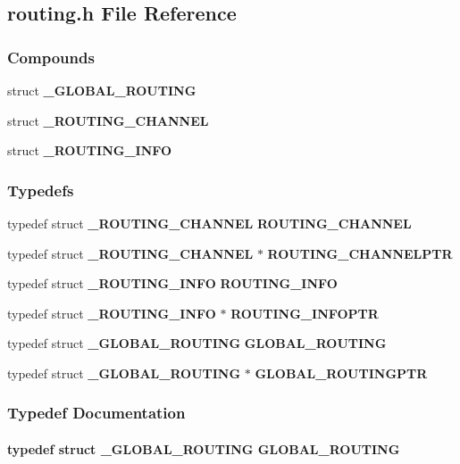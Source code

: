 \subsection{routing.h File Reference}
\label{routing.h}
\subsubsection*{Compounds}
\begin{CompactItemize}
\item 
struct {\bf \_\-GLOBAL\_\-ROUTING}
\item 
struct {\bf \_\-ROUTING\_\-CHANNEL}
\item 
struct {\bf \_\-ROUTING\_\-INFO}
\end{CompactItemize}
\subsubsection*{Typedefs}
\begin{CompactItemize}
\item 
typedef struct {\bf \_\-ROUTING\_\-CHANNEL}
 {\bf ROUTING\_\-CHANNEL}
\item 
typedef struct {\bf \_\-ROUTING\_\-CHANNEL} $\ast$ {\bf ROUTING\_\-CHANNELPTR}
\item 
typedef struct {\bf \_\-ROUTING\_\-INFO}
 {\bf ROUTING\_\-INFO}
\item 
typedef struct {\bf \_\-ROUTING\_\-INFO} $\ast$ {\bf ROUTING\_\-INFOPTR}
\item 
typedef struct {\bf \_\-GLOBAL\_\-ROUTING}
 {\bf GLOBAL\_\-ROUTING}
\item 
typedef struct {\bf \_\-GLOBAL\_\-ROUTING} $\ast$ {\bf GLOBAL\_\-ROUTINGPTR}
\end{CompactItemize}


\subsubsection{Typedef Documentation}
\label{routing.h_a4}
\paragraph{\setlength{\rightskip}{0pt plus 5cm}typedef struct {\bf \_\-GLOBAL\_\-ROUTING}
 GLOBAL\_\-ROUTING}\hfill

\label{routing.h_a5}
